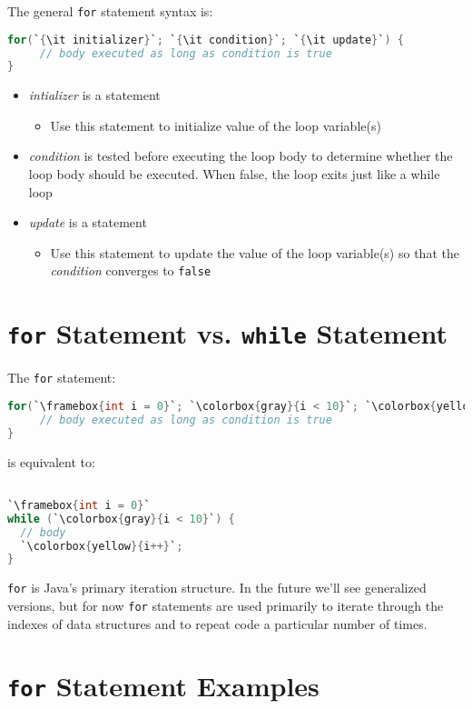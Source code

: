 \documentclass{article}
\begin{document}
The general {\tt for} statement syntax is:
\begin{lstlisting}[language=Java, escapechar=`]
for(`{\it initializer}`; `{\it condition}`; `{\it update}`) {
     // body executed as long as condition is true
}
\end{lstlisting}
\begin{itemize}
\item {\it intializer} is a statement
\begin{itemize}
\item Use this statement to initialize value of the loop variable(s)
\end{itemize}
\item {\it condition} is tested before executing the loop body to determine whether the loop body should be executed.  When false, the loop exits just like a while loop
\item {\it update} is a statement
\begin{itemize}
\item Use this statement to update the value of the loop variable(s) so that the {\it condition} converges to {\tt false}
\end{itemize}
\end{itemize}


\section{{\tt for} Statement vs. {\tt while} Statement}


The {\tt for} statement:
\begin{lstlisting}[language=Java,escapechar=`]
for(`\framebox{int i = 0}`; `\colorbox{gray}{i < 10}`; `\colorbox{yellow}{i++}`) {
     // body executed as long as condition is true
}
\end{lstlisting}

is equivalent to:
\begin{lstlisting}[language=Java,escapechar=`]

`\framebox{int i = 0}`
while (`\colorbox{gray}{i < 10}`) {
  // body
  `\colorbox{yellow}{i++}`;
}
\end{lstlisting}


{\tt for} is Java's primary iteration structure.  In the future we'll see generalized versions, but for now {\tt for} statements are used primarily to iterate through the indexes of data structures and to repeat code a particular number of times.



\section{{\tt for} Statement Examples}
\end{document}
